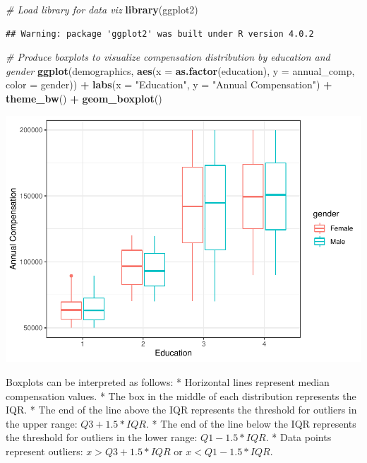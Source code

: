 \documentclass[]{book}
\newenvironment{Shaded}{\begin{snugshade}}{\end{snugshade}}
\newcommand{\CommentTok}[1]{\textcolor[rgb]{0.56,0.35,0.01}{\textit{#1}}}
\newcommand{\DataTypeTok}[1]{\textcolor[rgb]{0.13,0.29,0.53}{#1}}
\newcommand{\KeywordTok}[1]{\textcolor[rgb]{0.13,0.29,0.53}{\textbf{#1}}}
\newcommand{\NormalTok}[1]{#1}
\newcommand{\OperatorTok}[1]{\textcolor[rgb]{0.81,0.36,0.00}{\textbf{#1}}}
\newcommand{\StringTok}[1]{\textcolor[rgb]{0.31,0.60,0.02}{#1}}
\begin{document}
\begin{Shaded}
\begin{Highlighting}[]
\CommentTok{# Load library for data viz}
\KeywordTok{library}\NormalTok{(ggplot2)}
\end{Highlighting}
\end{Shaded}

\begin{verbatim}
## Warning: package 'ggplot2' was built under R version 4.0.2
\end{verbatim}

\begin{Shaded}
\begin{Highlighting}[]
\CommentTok{# Produce boxplots to visualize compensation distribution by education and gender}
\KeywordTok{ggplot}\NormalTok{(demographics, }\KeywordTok{aes}\NormalTok{(}\DataTypeTok{x =} \KeywordTok{as.factor}\NormalTok{(education), }\DataTypeTok{y =}\NormalTok{ annual_comp, }\DataTypeTok{color =}\NormalTok{ gender)) }\OperatorTok{+}
\StringTok{  }\KeywordTok{labs}\NormalTok{(}\DataTypeTok{x =} \StringTok{"Education"}\NormalTok{, }\DataTypeTok{y =} \StringTok{"Annual Compensation"}\NormalTok{) }\OperatorTok{+}\StringTok{ }
\StringTok{  }\KeywordTok{theme_bw}\NormalTok{() }\OperatorTok{+}
\StringTok{  }\KeywordTok{geom_boxplot}\NormalTok{()}
\end{Highlighting}
\end{Shaded}

\includegraphics{_main_files/figure-latex/unnamed-chunk-18-1.pdf}

Boxplots can be interpreted as follows:
* Horizontal lines represent median compensation values.
* The box in the middle of each distribution represents the IQR.
* The end of the line above the IQR represents the threshold for outliers in the upper range: \(Q3 + 1.5 * IQR\).
* The end of the line below the IQR represents the threshold for outliers in the lower range: \(Q1 - 1.5 * IQR\).
* Data points represent outliers: \(x > Q3 + 1.5 * IQR\) or \(x < Q1 - 1.5 * IQR\).
\end{document}
